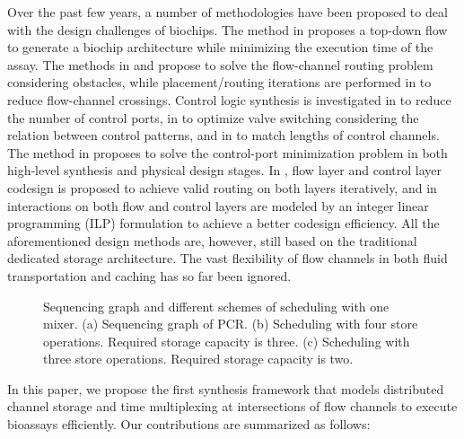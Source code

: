 Over the past few years, a number of methodologies have been proposed to deal with the design challenges of biochips. The method in \cite{MinhassPMB12} proposes a top-down flow to generate a biochip architecture while minimizing the execution time of the assay. The methods in \cite{LinLCLH14} and \cite{huang2019timing} propose to solve the flow-channel routing problem considering obstacles, while placement/routing iterations are performed in \cite{WangRYHC16} to reduce flow-channel crossings. Control logic synthesis is investigated in \cite{MinhassPMH13} to reduce the number of control ports, in \cite{WangZYHLSC17} to optimize valve switching considering the relation between control patterns, and in \cite{YaoHC15} to match lengths of control channels. The method in \cite{Huang2019DAC} proposes to solve the control-port minimization problem in both high-level synthesis and physical design stages.  In \cite{YaoWRCH15}, flow layer and control layer codesign is proposed to achieve valid routing on both layers iteratively, and in \cite{TsengLLHS16} interactions on both flow and control layers are modeled by an integer linear programming (ILP) formulation to achieve a better codesign efficiency. All the aforementioned design methods are, however, still based on the traditional dedicated storage architecture. The vast flexibility of flow channels in both fluid transportation and caching has so far been ignored.

\begin{figure}[t]
{\figurefontsize
\centering

\caption{Sequencing graph and different schemes of scheduling with
one mixer.
(a) Sequencing
graph of PCR. (b) Scheduling with four store operations.
Required storage capacity is three.
(c) Scheduling with three store operations. Required storage capacity is two.}
\label{fig:pcr}
}
\vspace{-0.5cm}
\end{figure}
In this paper, we propose the first synthesis framework that models distributed channel storage and time multiplexing at intersections of flow channels to execute bioassays efficiently. Our contributions are summarized as follows:

